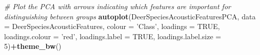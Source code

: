 \documentclass[]{book}
\newenvironment{Shaded}{\begin{snugshade}}{\end{snugshade}}
\newcommand{\CommentTok}[1]{\textcolor[rgb]{0.56,0.35,0.01}{\textit{#1}}}
\newcommand{\DataTypeTok}[1]{\textcolor[rgb]{0.13,0.29,0.53}{#1}}
\newcommand{\DecValTok}[1]{\textcolor[rgb]{0.00,0.00,0.81}{#1}}
\newcommand{\KeywordTok}[1]{\textcolor[rgb]{0.13,0.29,0.53}{\textbf{#1}}}
\newcommand{\NormalTok}[1]{#1}
\newcommand{\OperatorTok}[1]{\textcolor[rgb]{0.81,0.36,0.00}{\textbf{#1}}}
\newcommand{\OtherTok}[1]{\textcolor[rgb]{0.56,0.35,0.01}{#1}}
\newcommand{\StringTok}[1]{\textcolor[rgb]{0.31,0.60,0.02}{#1}}
\begin{document}
\begin{Shaded}
\begin{Highlighting}[]
\CommentTok{# Plot the PCA with arrows indicating which features are important for distinguishing between groups}
\KeywordTok{autoplot}\NormalTok{(DeerSpeciesAcousticFeaturesPCA, }\DataTypeTok{data =}\NormalTok{ DeerSpeciesAcousticFeatures, }\DataTypeTok{colour =} \StringTok{'Class'}\NormalTok{,}
         \DataTypeTok{loadings =} \OtherTok{TRUE}\NormalTok{, }\DataTypeTok{loadings.colour =} \StringTok{'red'}\NormalTok{,}
         \DataTypeTok{loadings.label =} \OtherTok{TRUE}\NormalTok{,}
         \DataTypeTok{loadings.label.size =} \DecValTok{5}\NormalTok{)}\OperatorTok{+}\KeywordTok{theme_bw}\NormalTok{()}
\end{Highlighting}
\end{Shaded}


\end{document}
